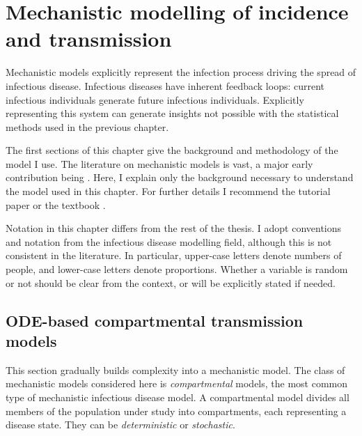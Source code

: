 \documentclass[thesis.tex]{subfiles}
\begin{document}
\ifSubfilesClassLoaded{
    \setcounter{chapter}{7}
}

\chapter{Mechanistic modelling of incidence and transmission} \label{SEIR}


Mechanistic models explicitly represent the infection process driving the spread of infectious disease.
Infectious diseases have inherent feedback loops: current infectious individuals generate future infectious individuals.
Explicitly representing this system can generate insights not possible with the statistical methods used in the previous chapter.

The first sections of this chapter give the background and methodology of the model I use.
The literature on mechanistic models is vast, a major early contribution being \textcite{kermackContribution}.
Here, I explain only the background necessary to understand the model used in this chapter.
For further details I recommend the tutorial paper \textcite{kretzschmarMathematical} or the textbook \textcite{keelingModeling}.

Notation in this chapter differs from the rest of the thesis.
I adopt conventions and notation from the infectious disease modelling field, although this is not consistent in the literature.
In particular, upper-case letters denote numbers of people, and lower-case letters denote proportions.
Whether a variable is random or not should be clear from the context, or will be explicitly stated if needed.

\section{ODE-based compartmental transmission models} \label{SEIR:sec:transmission}

This section gradually builds complexity into a mechanistic model.
The class of mechanistic models considered here is \emph{compartmental} models, the most common type of mechanistic infectious disease model.
A compartmental model divides all members of the population under study into compartments, each representing a disease state.
They can be \emph{deterministic} or \emph{stochastic}.
\end{document}

